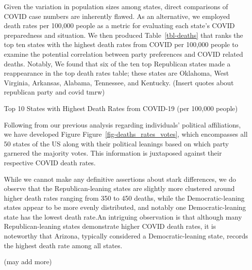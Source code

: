 \documentclass[
  letterpaper,
  DIV=11,
  numbers=noendperiod]{scrartcl}
\begin{document}
Given the variation in population sizes among states, direct comparisons
of COVID case numbers are inherently flawed. As an alternative, we
employed death rates per 100,000 people as a metric for evaluating each
state's COVID preparedness and situation. We then produced
Table~\ref{tbl-deaths} that ranks the top ten states with the highest
death rates from COVID per 100,000 people to examine the potential
correlation between party preferences and COVID related deaths. Notably,
We found that six of the ten top Republican states made a reappearance
in the top death rates table; these states are Oklahoma, West Virginia,
Arkansas, Alabama, Tennessee, and Kentucky. (Insert quotes about
republican party and covid tmrw)

\begin{table}

\caption{\label{tbl-deaths}Top 10 States with Highest Death Rates from
COVID-19 (per 100,000 people)}

\centering{

}

\end{table}%

Following from our previous analysis regarding individuals' political
affiliations, we have developed Figure
Figure~\ref{fig-deaths_rates_votes}, which encompasses all 50 states of
the US along with their political leanings based on which party garnered
the majority votes. This information is juxtaposed against their
respective COVID death rates.

While we cannot make any definitive assertions about stark differences,
we do observe that the Republican-leaning states are slightly more
clustered around higher death rates ranging from 350 to 450 deaths,
while the Democratic-leaning states appear to be more evenly
distributed, and notably one Democratic-leaning state has the lowest
death rate.An intriguing observation is that although many
Republican-leaning states demonstrate higher COVID death rates, it is
noteworthy that Arizona, typically considered a Democratic-leaning
state, records the highest death rate among all states.

(may add more)
\end{document}
